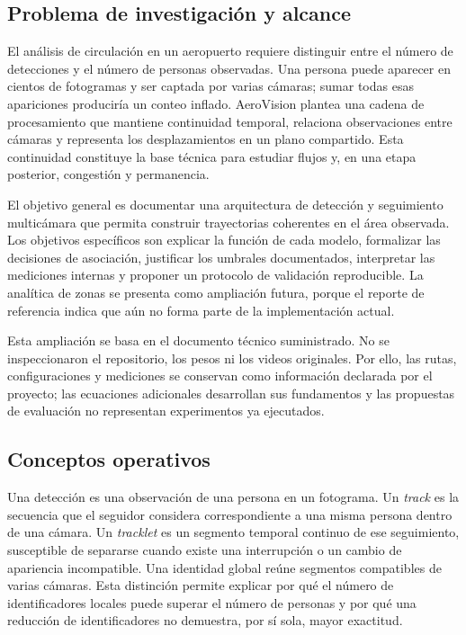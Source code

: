 \documentclass[12pt,letterpaper]{article}
\begin{document}
\subsection{Problema de investigación y alcance}
El análisis de circulación en un aeropuerto requiere distinguir entre el número de detecciones y el número de personas observadas. Una persona puede aparecer en cientos de fotogramas y ser captada por varias cámaras; sumar todas esas apariciones produciría un conteo inflado. AeroVision plantea una cadena de procesamiento que mantiene continuidad temporal, relaciona observaciones entre cámaras y representa los desplazamientos en un plano compartido. Esta continuidad constituye la base técnica para estudiar flujos y, en una etapa posterior, congestión y permanencia.

El objetivo general es documentar una arquitectura de detección y seguimiento multicámara que permita construir trayectorias coherentes en el área observada. Los objetivos específicos son explicar la función de cada modelo, formalizar las decisiones de asociación, justificar los umbrales documentados, interpretar las mediciones internas y proponer un protocolo de validación reproducible. La analítica de zonas se presenta como ampliación futura, porque el reporte de referencia indica que aún no forma parte de la implementación actual.

Esta ampliación se basa en el documento técnico suministrado. No se inspeccionaron el repositorio, los pesos ni los videos originales. Por ello, las rutas, configuraciones y mediciones se conservan como información declarada por el proyecto; las ecuaciones adicionales desarrollan sus fundamentos y las propuestas de evaluación no representan experimentos ya ejecutados.

\subsection{Conceptos operativos}
Una detección es una observación de una persona en un fotograma. Un \textit{track} es la secuencia que el seguidor considera correspondiente a una misma persona dentro de una cámara. Un \textit{tracklet} es un segmento temporal continuo de ese seguimiento, susceptible de separarse cuando existe una interrupción o un cambio de apariencia incompatible. Una identidad global reúne segmentos compatibles de varias cámaras. Esta distinción permite explicar por qué el número de identificadores locales puede superar el número de personas y por qué una reducción de identificadores no demuestra, por sí sola, mayor exactitud.
\end{document}
